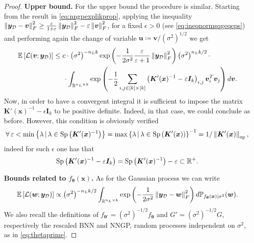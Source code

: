 \begin{proof}
	\textbf{Upper bound.} For the upper bound the procedure is similar.
	Starting from the result in \cref{eq:nngpexplikprop}, applying the inequality $\left\lVert\bm{y}_{\mathcal{D}} - \bm{v}\right\rVert_F^2 \geq \frac{\varepsilon}{1 + \varepsilon} \left\lVert\bm{y}_{\mathcal{D}}\right\rVert_F^2 - \varepsilon \left\lVert\bm{v}\right\rVert_F^2$, for a fixed $\epsilon > 0$ (see \cref{eq:ineqnormsqgeqeps}) and performing again the change of variable $\bm{u} \coloneqq \bm{v} / (\sigma^2)^{1/2}$ we get
	\begin{align*}
		\mathbb{E}_{\kern-0.5pt}\left[\mathcal{L}(\bm{v}; \bm{y}_{\mathcal{D}})\right] & \leq c \cdot \left(\sigma^2\right)^{- n_L k} \operatorname{exp}\left(-\frac{1}{2 \sigma^2} \frac{\varepsilon}{\varepsilon + 1} \left\lVert\bm{y}_{\mathcal{D}}\right\rVert_F^2\right) \left(\sigma^2\right)^{n_L k /2} \cdot \\
		& \kern14.65pt \cdot \int_{\mathbb{R}^{n_L \times k}} \operatorname{exp}\left(-\frac{1}{2} \sum_{i, j \in [k] \times [k]} \left(\bm{K}'(\bm{x})^{-1} - \varepsilon \bm{I}_k\right)_{i, j} \bm{v}_i^T \bm{v}_j\right) d\bm{v}.
	\end{align*}
	Now, in order to have a convergent integral it is sufficient to impose the matrix $\bm{K}'(\bm{x})^{-1} - \epsilon \bm{I}_k$ to be positive definite. Indeed, in that case, we could conclude as before. 
	However, this condition is obviously verified 
	\begin{equation*}
		\forall \epsilon < \min\left\{\lambda \given \lambda \in \operatorname{Sp}\left(\bm{K}'(\bm{x})^{-1}\right)\right\} = \max\left\{\lambda \given \lambda \in \operatorname{Sp}\left(\bm{K}'(\bm{x})\right)\right\}^{-1} = 1/\norm{\bm{K}'(\bm{x})}_{\mathrm{op}},
	\end{equation*}
	indeed for such $\epsilon$ one has that 
	\begin{equation*}
		\operatorname{Sp}\left(\bm{K}'(\bm{x})^{-1} - \varepsilon \bm{I}_k\right) = \operatorname{Sp}\left(\bm{K}'(\bm{x})^{-1}\right) - \varepsilon \subset \mathbb{R}^+.
	\end{equation*}
	
	\textbf{Bounds related to $f_{\bm{\theta}}(\bm{x})$.} As for the Gaussian process we can write 
	\begin{equation} \label{eq:nnexplikelihood}
		\mathbb{E}_{\kern-0.5pt}\left[\mathcal{L}(\bm{w}; \bm{y}_{\mathcal{D}})\right] \propto \left(\sigma^2\right)^{- n_L k / 2} \int_{\mathbb{R}^{n_L \times k}} \operatorname{exp}\left(-\frac{1}{2\sigma^2} \left\lVert\bm{y}_{\mathcal{D}} - \bm{w}\right\rVert_F^2\right) d \mathbb{P}_{f_{\bm{\theta}}(\bm{x}) | \sigma^2}(\bm{w}).
	\end{equation}
	We also recall the definitions of $f_{\bm{\theta}'} = (\sigma^2)^{-1/2} f_{\bm{\theta}}$ and $G' = (\sigma^2)^{-1/2} G$, respectively the rescaled BNN and NNGP, random processes independent on $\sigma^2$, as in \cref{eq:thetaprime}.


\end{proof}
